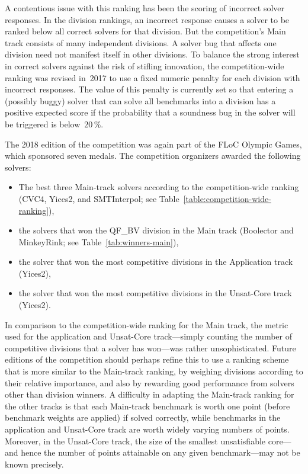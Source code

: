 \documentclass[dvipsnames,table,twoside,11pt]{article}
\begin{document}
A contentious issue with this ranking has been the scoring of
incorrect solver responses.  In the division rankings, an incorrect
response causes a solver to be ranked below all correct solvers for
that division.  But the competition's Main track consists of many
independent divisions.  A solver bug that affects one division need
not manifest itself in other divisions.  To balance the strong
interest in correct solvers against the risk of stifling innovation,
the competition-wide ranking was revised in~2017 to use a fixed
numeric penalty for each division with incorrect responses.  The value
of this penalty is currently set so that entering a (possibly buggy)
solver that can solve all benchmarks into a division has a positive
expected score if the probability that a soundness bug in the solver
will be triggered is below~$20\,\%$.~\cite{rules18}

The 2018 edition of the competition was again part of the FLoC Olympic
Games, which sponsored seven medals.  The competition organizers
awarded the following solvers:
\begin{itemize}
\item The best three Main-track solvers according to the
  competition-wide ranking (CVC4, Yices2, and SMTInterpol; see
  Table~\ref{table:competition-wide-ranking}),
\item the solvers that won the QF\_BV division in the Main track
  (Boolector and MinkeyRink; see Table~\ref{tab:winners-main}),
\item the solver that won the most competitive divisions in the
  Application track (Yices2),
\item the solver that won the most competitive divisions in the
  Unsat-Core track (Yices2).
\end{itemize}

In comparison to the competition-wide ranking for the Main track, the
metric used for the application and Unsat-Core track---simply counting
the number of competitive divisions that a solver has won---was rather
unsophisticated.  Future editions of the competition should perhaps
refine this to use a ranking scheme that is more similar to the
Main-track ranking, by weighing divisions according to their relative
importance, and also by rewarding good performance from solvers other
than division winners.  A difficulty in adapting the Main-track
ranking for the other tracks is that each Main-track benchmark is
worth one point (before benchmark weights are applied) if solved
correctly, while benchmarks in the application and Unsat-Core track
are worth widely varying numbers of points.  Moreover, in the
Unsat-Core track, the size of the smallest unsatisfiable core---and
hence the number of points attainable on any given benchmark---may not
be known precisely.
\end{document}
